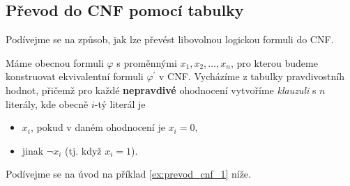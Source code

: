 \subsection{Převod do CNF pomocí tabulky}

Podívejme se na způsob, jak lze převést libovolnou logickou formuli do CNF.

Máme obecnou formuli $\varphi$ s proměnnými $x_1,x_2,\dots,x_n$, pro kterou budeme konstruovat ekvivalentní formuli $\varphi^\prime$ v CNF. Vycházíme z tabulky pravdivostníh hodnot, přičemž pro každé \textbf{nepravdivé} ohodnocení vytvoříme \emph{klauzuli} s $n$ literály, kde obecně $i$-tý literál je
\begin{itemize}
    \item $x_i$, pokud v daném ohodnocení je $x_i=0$,
    \item jinak $\neg x_i$ (tj. když $x_i=1$).
\end{itemize}
Podívejme se na úvod na příklad \ref{ex:prevod_cnf_1} níže.
